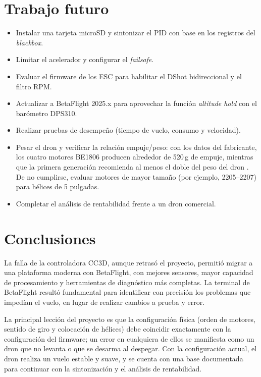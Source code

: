 \documentclass[11pt,letterpaper]{article}
\begin{document}
\section{Trabajo futuro}
\begin{itemize}[nosep]
    \item Instalar una tarjeta microSD y sintonizar el PID con base en los registros del \textit{blackbox}.
    \item Limitar el acelerador y configurar el \textit{failsafe}.
    \item Evaluar el firmware de los ESC para habilitar el DShot bidireccional y el filtro RPM.
    \item Actualizar a BetaFlight 2025.x para aprovechar la función \textit{altitude hold} con el barómetro DPS310.
    \item Realizar pruebas de desempeño (tiempo de vuelo, consumo y velocidad).
    \item Pesar el dron y verificar la relación empuje/peso: con los datos del fabricante, los cuatro motores BE1806 producen alrededor de 520\,g de empuje, mientras que la primera generación recomienda al menos el doble del peso del dron \cite{reporte2021}. De no cumplirse, evaluar motores de mayor tamaño (por ejemplo, 2205--2207) para hélices de 5 pulgadas.
    \item Completar el análisis de rentabilidad frente a un dron comercial.
\end{itemize}

\section{Conclusiones}
La falla de la controladora CC3D, aunque retrasó el proyecto, permitió migrar a una plataforma moderna con BetaFlight, con mejores sensores, mayor capacidad de procesamiento y herramientas de diagnóstico más completas. La terminal de BetaFlight resultó fundamental para identificar con precisión los problemas que impedían el vuelo, en lugar de realizar cambios a prueba y error.

La principal lección del proyecto es que la configuración física (orden de motores, sentido de giro y colocación de hélices) debe coincidir exactamente con la configuración del firmware; un error en cualquiera de ellos se manifiesta como un dron que no levanta o que se desarma al despegar. Con la configuración actual, el dron realiza un vuelo estable y suave, y se cuenta con una base documentada para continuar con la sintonización y el análisis de rentabilidad.
\end{document}
